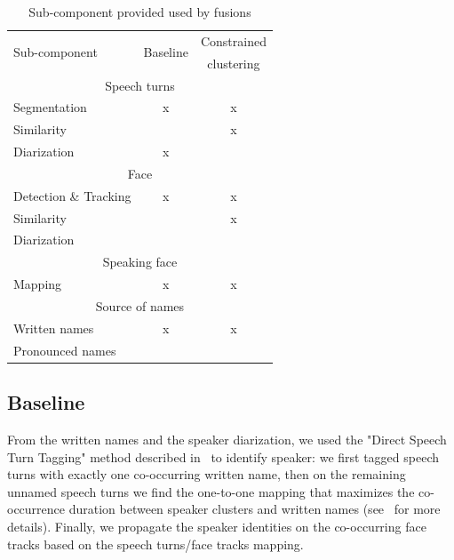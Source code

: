\documentclass{acm_proc_article-me}
\begin{document}
\begin{table}[ht]
  \centering
  \begin{tabular}{|l|c|c|}
    \hline
	\multirow{2}{*}{Sub-component}	& \multirow{2}{*}{Baseline}	& Constrained 		\\
									&							& clustering 		\\
	\hline
	\hline
	\multicolumn{3}{|c|}{Speech turns}												\\	 
	\hline
	Segmentation						&			x				&		x			\\
	Similarity						&							&		x			\\
	Diarization						&			x				&					\\
	\hline
	\multicolumn{3}{|c|}{Face}														\\
	\hline
	Detection \& Tracking			&			x				&		x			\\
	Similarity						&							&		x			\\
	Diarization						&							&					\\
	\hline
	\multicolumn{3}{|c|}{Speaking face}												\\
	\hline
	Mapping							&			x				&		x			\\
	\hline
	\multicolumn{3}{|c|}{Source of names}											\\	 
	\hline
	Written names~\cite{POIGNANT--ICME--2012}	&		x		&		x			\\
	Pronounced names~\cite{LAMEL--IWSLT--2011, DIANRELLI--IJCNLP--2011}	&	&		\\
	\hline
  \end{tabular}
  \caption{Sub-component provided used by fusions}
  \label{tab:subcomp}
\end{table}


\subsection{Baseline}

From the written names and the speaker diarization, we used the "Direct Speech Turn Tagging" method described in~\cite{POIGNANT--INTERSPEECH--2012} to identify speaker: we first tagged speech turns with exactly one co-occurring written name, then on the remaining unnamed speech turns we find the one-to-one mapping that maximizes the co-occurrence duration between speaker clusters and written names (see~\cite{POIGNANT--INTERSPEECH--2012} for more details). Finally, we propagate the speaker identities on the co-occurring face tracks based on the speech turns/face tracks mapping.
\end{document}
